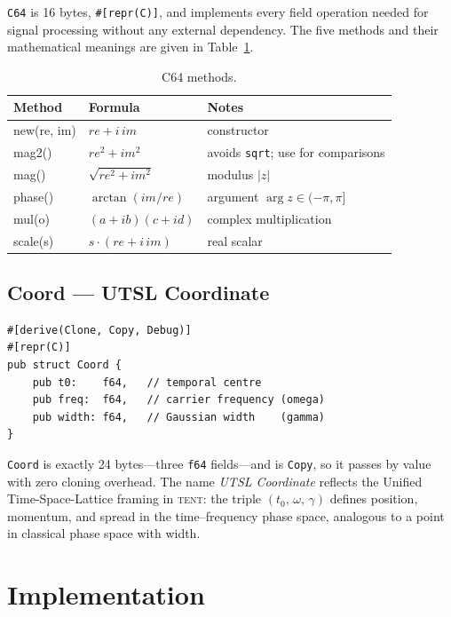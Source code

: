 \documentclass[11pt,a4paper]{article}
\theoremstyle{definition}
\newcommand{\TENT}{\textsc{tent}}
\newcommand{\CB}[1]{\texttt{#1}}
\begin{document}
\CB{C64} is 16 bytes, \CB{\#[repr(C)]}, and implements every field
operation needed for signal processing without any external dependency.
The five methods and their mathematical meanings are given in
Table~\ref{tab:c64_ops}.

\begin{table}[h]
\centering
\caption{C64 methods.}
\label{tab:c64_ops}
\begin{tabular}{>{\ttfamily}lll}
\toprule
Method & Formula & Notes \\
\midrule
new(re, im) & $\mathit{re} + i\,\mathit{im}$ & constructor \\
mag2() & $\mathit{re}^2 + \mathit{im}^2$ & avoids \CB{sqrt}; use for comparisons \\
mag() & $\sqrt{\mathit{re}^2 + \mathit{im}^2}$ & modulus $|z|$ \\
phase() & $\arctan(\mathit{im}/\mathit{re})$ & argument $\arg z \in (-\pi,\pi]$ \\
mul(o) & $(a+ib)(c+id)$ & complex multiplication \\
scale(s) & $s \cdot (\mathit{re} + i\,\mathit{im})$ & real scalar \\
\bottomrule
\end{tabular}
\end{table}

\subsection{Coord --- UTSL Coordinate}

\begin{lstlisting}[caption={Coord: 24-byte copy type, the minimal packet parameterisation},label={lst:coord}]
#[derive(Clone, Copy, Debug)]
#[repr(C)]
pub struct Coord {
    pub t0:    f64,   // temporal centre
    pub freq:  f64,   // carrier frequency (omega)
    pub width: f64,   // Gaussian width    (gamma)
}
\end{lstlisting}

\CB{Coord} is exactly 24 bytes---three \CB{f64} fields---and is
\CB{Copy}, so it passes by value with zero cloning overhead.
The name \emph{UTSL Coordinate} reflects the
Unified Time-Space-Lattice framing in \TENT{}: the triple
$(t_0,\,\omega,\,\gamma)$ defines position, momentum, and spread in the
time--frequency phase space, analogous to a point in classical
phase space with width.

\section{Implementation}
\label{sec:impl}
\end{document}
